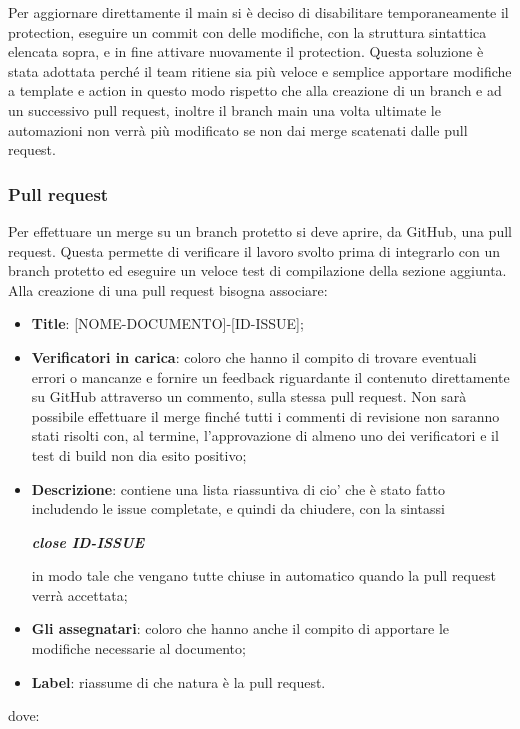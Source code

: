         Per aggiornare direttamente il main si è deciso di disabilitare temporaneamente
        il protection, eseguire un commit con delle modifiche, con la struttura sintattica elencata sopra, e in fine attivare nuovamente il protection.
        Questa soluzione è stata adottata perché il team ritiene sia più veloce e semplice apportare modifiche a template e action in questo modo
        rispetto che alla creazione di un branch e ad un successivo pull request, inoltre il branch main una volta ultimate le automazioni non verrà più modificato se non dai merge
        scatenati dalle pull request.

        \subsubsection{Pull request}\label{inf:pr}
        Per effettuare un merge su un branch protetto si deve aprire, da GitHub, una pull request. Questa
        permette di verificare il lavoro svolto prima di integrarlo con un branch protetto ed eseguire un veloce test di compilazione della sezione aggiunta.
        Alla creazione di una pull request bisogna associare:
        \begin{itemize}
            \item \textbf{Title}: [NOME-DOCUMENTO]-[ID-ISSUE];
            \item \textbf{Verificatori in carica}: coloro che hanno il compito di trovare eventuali errori o mancanze e fornire un feedback
            riguardante il contenuto direttamente su GitHub attraverso un commento, sulla stessa pull request.
            Non sarà possibile effettuare il merge finché tutti i commenti di revisione non saranno stati risolti
            con, al termine, l'approvazione di almeno uno dei verificatori e il test di build non dia esito positivo;
            \item \textbf{Descrizione}: contiene una lista riassuntiva di cio' che è stato fatto includendo le issue completate, e quindi da chiudere,
            con la sintassi
            \begin{center}
                \textbf{\textit{close ID-ISSUE}}
            \end{center}
            in modo tale che vengano tutte chiuse in automatico quando la pull request verrà accettata;
            \item \textbf{Gli assegnatari}: coloro che hanno anche il compito di apportare le modifiche necessarie al documento;
            \item \textbf{Label}: riassume di che natura è la pull request.
        \end{itemize}
        dove:

